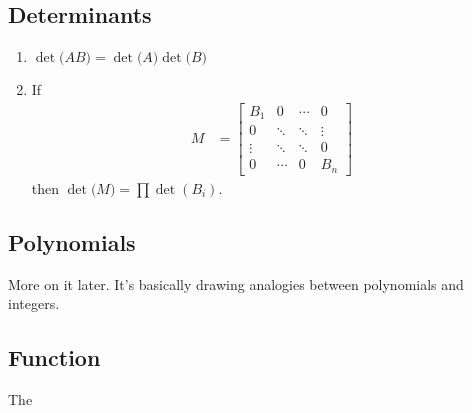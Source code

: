 \documentclass[../main.tex]{subfiles}
\begin{document}
\subsection*{Determinants}
\begin{enumerate}[label = \arabic*.]
    \item $\det\bigl(AB\bigr) = \det\bigl(A\bigr)\det\bigl(B\bigr)$
    \item If 
        \begin{align*}
            M &= \begin{bmatrix}
                B_1 & 0 & \cdots & 0 \\
                0 & \ddots & \ddots & \vdots \\
                \vdots & \ddots & \ddots & 0 \\
                0 & \cdots & 0 & B_n
            \end{bmatrix}
        \end{align*}
        then $\det\bigl(M\bigr) = \prod \det(B_i)$.
\end{enumerate}

\subsection*{Polynomials}
More on it later.
It's basically drawing analogies between polynomials and integers.

\subsection*{Function}
The 
\end{document}
